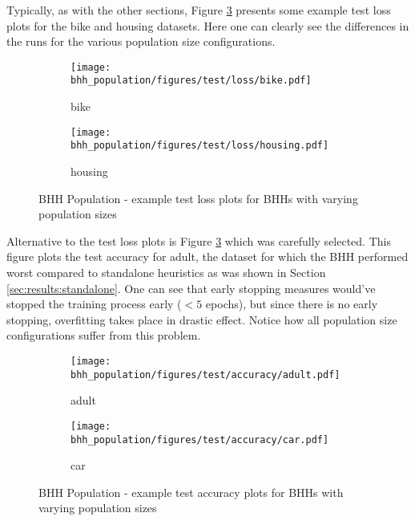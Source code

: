 Typically, as with the other sections, Figure \ref{fig:results:population:figures:loss} presents some example test loss plots for the bike and housing datasets. Here one can clearly see the differences in the runs for the various population size configurations.


\begin{figure}[htbp]
	\begin{subfigure}{0.5\textwidth}
		\centering
		\texttt{[image: bhh\_population/figures/test/loss/bike.pdf]}
		\caption{bike}
		\label{fig:results:population:figures:loss1}
	\end{subfigure}
	\begin{subfigure}{0.5\textwidth}
		\centering
		\texttt{[image: bhh\_population/figures/test/loss/housing.pdf]}
		\caption{housing}
		\label{fig:results:population:figures:loss2}
	\end{subfigure}
	\caption{\Acs{BHH} Population - example test loss plots for \Acsp{BHH} with varying population sizes}
	\label{fig:results:population:figures:loss}
\end{figure}

Alternative to the test loss plots is Figure \ref{fig:results:population:figures:loss} which was carefully selected. This figure plots the test accuracy for adult, the dataset for which the \Ac{BHH} performed worst compared to standalone heuristics as was shown in Section \ref{sec:results:standalone}. One can see that early stopping measures would've stopped the training process early ($< 5$ epochs), but since there is no early stopping, overfitting takes place in drastic effect. Notice how all population size configurations suffer from this problem.

\begin{figure}[htbp]
	\begin{subfigure}{0.5\textwidth}
		\centering
		\texttt{[image: bhh\_population/figures/test/accuracy/adult.pdf]}
		\caption{adult}
		\label{fig:results:population:figures:accuracy1}
	\end{subfigure}
	\begin{subfigure}{0.5\textwidth}
		\centering
		\texttt{[image: bhh\_population/figures/test/accuracy/car.pdf]}
		\caption{car}
		\label{fig:results:population:figures:accuracy2}
	\end{subfigure}
	\caption{\Acs{BHH} Population - example test accuracy plots for \Acsp{BHH} with varying population sizes}
	\label{fig:results:population:figures:accuracy}
\end{figure}

